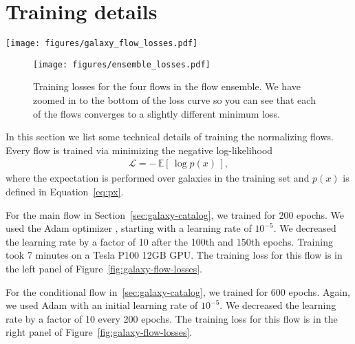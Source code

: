 \documentclass[twocolumn,twocolappendix]{aastex631}
\begin{document}
\appendix

\section{Training details}
\label{app:training-details}

\begin{figure*}[t!]
    \begin{centering}
        \texttt{[image: figures/galaxy\_flow\_losses.pdf]}
        \caption{
            Training losses for the normalizing flows used to simulate the galaxy catalog.
            Left: losses for the regular flow.
            Right: losses for the conditional flow.
        }
        \label{fig:galaxy-flow-losses}
    \end{centering}
\end{figure*}

\begin{figure}[t!]
    \begin{centering}
        \texttt{[image: figures/ensemble\_losses.pdf]}
        \caption{
            Training losses for the four flows in the flow ensemble.
            We have zoomed in to the bottom of the loss curve so you can see that each of the flows converges to a slightly different minimum loss.
        }
        \label{fig:ensemble-losses}
    \end{centering}
\end{figure}

In this section we list some technical details of training the normalizing flows.
Every flow is trained via minimizing the negative log-likelihood
\begin{align}
    \mathcal{L} = - \, \mathbb{E}[ \, \log p(x) \, ],
\end{align}
where the expectation is performed over galaxies in the training set and $p(x)$ is defined in Equation~\ref{eq:px}.

For the main flow in Section~\ref{sec:galaxy-catalog}, we trained for 200 epochs.
We used the Adam optimizer \citep{adam}, starting with a learning rate of $10^{-5}$.
We decreased the learning rate by a factor of 10 after the 100th and 150th epochs.
Training took 7 minutes on a Tesla P100 12GB GPU.
The training loss for this flow is in the left panel of Figure~\ref{fig:galaxy-flow-losses}.

For the conditional flow in~\ref{sec:galaxy-catalog}, we trained for 600 epochs.
Again, we used Adam with an initial learning rate of $10^{-5}$.
We decreased the learning rate by a factor of 10 every 200 epochs.
The training loss for this flow is in the right panel of Figure~\ref{fig:galaxy-flow-losses}.
\end{document}

